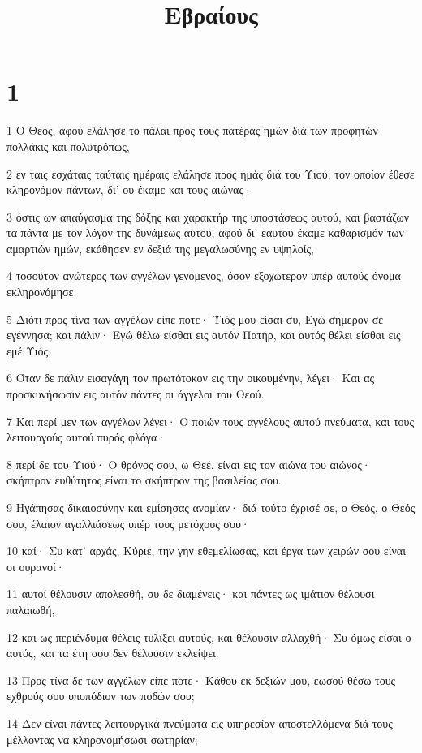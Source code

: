 

\title{Εβραίους}


\chapter{1}

\par 1 Ο Θεός, αφού ελάλησε το πάλαι προς τους πατέρας ημών διά των προφητών πολλάκις και πολυτρόπως,
\par 2 εν ταις εσχάταις ταύταις ημέραις ελάλησε προς ημάς διά του Υιού, τον οποίον έθεσε κληρονόμον πάντων, δι' ου έκαμε και τους αιώνας·
\par 3 όστις ων απαύγασμα της δόξης και χαρακτήρ της υποστάσεως αυτού, και βαστάζων τα πάντα με τον λόγον της δυνάμεως αυτού, αφού δι' εαυτού έκαμε καθαρισμόν των αμαρτιών ημών, εκάθησεν εν δεξιά της μεγαλωσύνης εν υψηλοίς,
\par 4 τοσούτον ανώτερος των αγγέλων γενόμενος, όσον εξοχώτερον υπέρ αυτούς όνομα εκληρονόμησε.
\par 5 Διότι προς τίνα των αγγέλων είπε ποτε· Υιός μου είσαι συ, Εγώ σήμερον σε εγέννησα; και πάλιν· Εγώ θέλω είσθαι εις αυτόν Πατήρ, και αυτός θέλει είσθαι εις εμέ Υιός;
\par 6 Όταν δε πάλιν εισαγάγη τον πρωτότοκον εις την οικουμένην, λέγει· Και ας προσκυνήσωσιν εις αυτόν πάντες οι άγγελοι του Θεού.
\par 7 Και περί μεν των αγγέλων λέγει· Ο ποιών τους αγγέλους αυτού πνεύματα, και τους λειτουργούς αυτού πυρός φλόγα·
\par 8 περί δε του Υιού· Ο θρόνος σου, ω Θεέ, είναι εις τον αιώνα του αιώνος· σκήπτρον ευθύτητος είναι το σκήπτρον της βασιλείας σου.
\par 9 Ηγάπησας δικαιοσύνην και εμίσησας ανομίαν· διά τούτο έχρισέ σε, ο Θεός, ο Θεός σου, έλαιον αγαλλιάσεως υπέρ τους μετόχους σου·
\par 10 καί· Συ κατ' αρχάς, Κύριε, την γην εθεμελίωσας, και έργα των χειρών σου είναι οι ουρανοί·
\par 11 αυτοί θέλουσιν απολεσθή, συ δε διαμένεις· και πάντες ως ιμάτιον θέλουσι παλαιωθή,
\par 12 και ως περιένδυμα θέλεις τυλίξει αυτούς, και θέλουσιν αλλαχθή· Συ όμως είσαι ο αυτός, και τα έτη σου δεν θέλουσιν εκλείψει.
\par 13 Προς τίνα δε των αγγέλων είπε ποτε· Κάθου εκ δεξιών μου, εωσού θέσω τους εχθρούς σου υποπόδιον των ποδών σου;
\par 14 Δεν είναι πάντες λειτουργικά πνεύματα εις υπηρεσίαν αποστελλόμενα διά τους μέλλοντας να κληρονομήσωσι σωτηρίαν;

